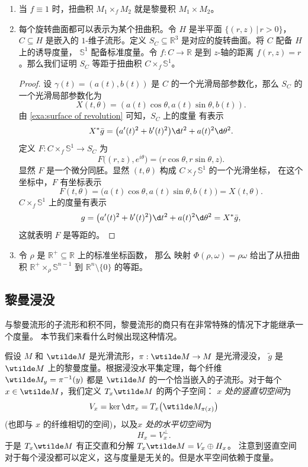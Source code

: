 \begin{example}[扭曲积]
  \mbox{}
  \begin{enumerate}
    \item 当 $f\equiv 1$ 时，扭曲积 $M_1\times_f M_2$ 就是黎曼积 $M_1\times M_2$。
    \item 每个旋转曲面都可以表示为某个扭曲积。令 $H$ 是半平面 $\{(r,z)\,|\, r>0\}$，$C\subseteq H$ 是嵌入的 $1$-维子流形。定义
    $S_C\subseteq \mathbb{R}^3$ 是对应的旋转曲面。将 $C$ 配备 $H$ 上的诱导度量，
    $\mathbb{S}^1$ 配备标准度量。令 $f:C\to \mathbb{R}$ 是到 $z$-轴的距离
    $f(r,z)=r$。那么我们证明 $S_C$ 等距于扭曲积 $C\times_f \mathbb{S}^1$。
    \begin{proof}
      设 $\gamma(t)=(a(t),b(t))$ 是 $C$ 的一个光滑局部参数化，那么 $S_C$
      的一个光滑局部参数化为
      \[
        X(t,\theta)=(a(t)\cos\theta,a(t)\sin\theta,b(t)).
      \]
      由 \ref{exa:surface of revolution} 可知，$S_C$ 上的度量
      有表示
      \[
        X^*\bar g=\bigl(a'(t)^2+b'(t)^2\bigr)\d t^2+a(t)^2\d\theta^2.
      \]
      定义 $F: C\times_f \mathbb{S}^1\to S_C$ 为 
      \[
        F\bigl((r,z),e^{i\theta}\bigr)=\bigl(r\cos\theta,r\sin\theta,z\bigr).
      \]
      显然 $F$ 是一个微分同胚。显然 $(t,\theta)$ 构成 $C\times_f \mathbb{S}^1$ 的一个光滑坐标，
      在这个坐标中，$F$ 有坐标表示
      \[
        F(t,\theta)=\bigl(a(t)\cos\theta,a(t)\sin\theta,b(t)\bigr)=X(t,\theta).
      \]
      $C\times_f \mathbb{S}^1$ 上的度量有表示
      \[
        g=\bigl(a'(t)^2+b'(t)^2\bigr)\d t^2+a(t)^2\d\theta^2=X^*\bar g,
      \]
      这就表明 $F$ 是等距的。
    \end{proof}

    \item 令 $\rho$ 是 $\mathbb{R}^+\subseteq \mathbb{R}$ 上的标准坐标函数，
    那么 映射 $\Phi(\rho,\omega)=\rho\omega$ 给出了从扭曲积 $\mathbb{R}^+\times_\rho \mathbb{S}^{n-1}$
    到 $\mathbb{R}^n\setminus\{0\}$ 的等距。
  \end{enumerate}
\end{example}

\subsection{黎曼浸没}

与黎曼流形的子流形和积不同，黎曼流形的商只有在非常特殊的情况下才能继承一个度量。
本节我们来看什么时候出现这种情况。

假设 $M$ 和 $\wtilde M$ 是光滑流形，$\pi:\wtilde M\to M$ 是光滑浸没，
$\tilde g$ 是 $\wtilde M$ 上的黎曼度量。根据浸没水平集定理，每个纤维
$\wtilde M_y=\pi^{-1}(y)$ 都是 $\wtilde M$ 的一个恰当嵌入的子流形。对于每个
$x\in\wtilde M$，我们定义 $T_x\wtilde M$ 的两个子空间：
\emph{$x$ 处的竖直切空间}为
\[
  V_x=\ker \d\pi_x=T_x\bigl(\wtilde M_{\pi(x)}\bigr)
\]
(也即与 $x$ 的纤维相切的空间)，以及\emph{$x$ 处的水平切空间}为
\[
  H_x=V_x^\bot.
\]
于是 $T_x\wtilde M$ 有正交直和分解 $T_x\wtilde M=V_x\oplus H_x$。
注意到竖直空间对于每个浸没都可以定义，这与度量是无关的。但是水平空间依赖于度量。

